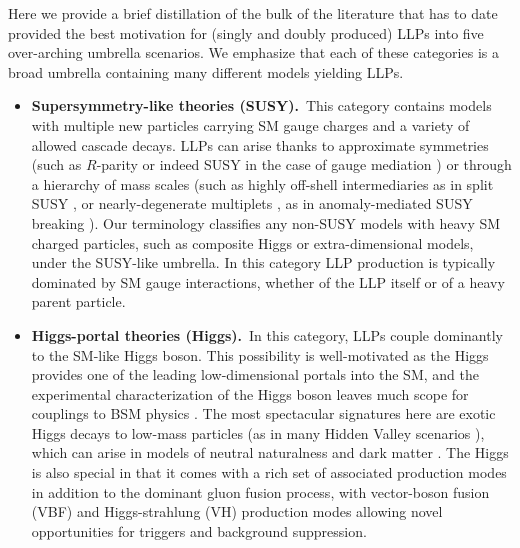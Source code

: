 Here we provide a brief distillation of the bulk of the literature that has to date provided the best motivation for (singly and doubly produced) LLPs into five over-arching umbrella scenarios.  We emphasize that each of these categories is a broad umbrella containing many different models yielding LLPs.
%
\begin{itemize}

\item {\bf Supersymmetry-like theories (SUSY).}~This category contains models
  with multiple new particles carrying SM gauge charges and a variety
  of allowed cascade decays. LLPs can arise thanks to approximate
  symmetries (such as $R$-parity \cite{Barbier:2004ez} or indeed SUSY in the case
  of gauge mediation \cite{Dimopoulos:1996vz}) or through a hierarchy of mass scales (such as
  highly off-shell intermediaries as in split SUSY \cite{ArkaniHamed:2004fb}, or
  nearly-degenerate multiplets \cite{Chen:1995yu,Thomas:1998wy}, as in anomaly-mediated SUSY breaking \cite{Feng:1999fu}).  Our terminology
  classifies any non-SUSY models with heavy SM charged particles, such
  as composite Higgs or extra-dimensional models, under the SUSY-like
  umbrella.  In this category LLP production is typically dominated by
  SM gauge interactions, whether of the LLP itself or of a heavy
  parent particle.

\item {\bf Higgs-portal theories (Higgs).}~In this category, LLPs couple dominantly to the SM-like Higgs boson.  This possibility is well-motivated as the Higgs provides one of the leading low-dimensional portals into the SM, and the experimental characterization of the Higgs boson leaves much scope for couplings to BSM physics \cite{Khachatryan:2014jba,Aad:2015pla}.  The most spectacular signatures here are exotic Higgs decays  to low-mass particles  \cite{Curtin:2013fra} (as in many Hidden Valley scenarios \cite{Strassler:2006im,Strassler:2006ri}), which can arise in models of neutral naturalness \cite{Chacko:2005pe,Burdman:2006tz,Craig:2015pha} and dark matter \cite{Silveira:1985rk}.  
The Higgs is also special in that it comes with a rich set of associated production modes in addition to the dominant gluon fusion process, with vector-boson fusion (VBF) and Higgs-strahlung (VH) production modes allowing novel opportunities for triggers and background suppression.


\end{itemize}
